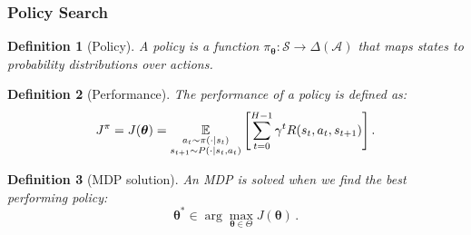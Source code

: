 \documentclass[english,aspectratio=1610]{beamer}
\theoremstyle{mystyle}
\newtheorem{defi}{Definition}
\theoremstyle{mystyle}
\theoremstyle{mystyle}
\begin{document}

\begin{frame}
	\frametitle{Policy Search}
	\begin{defi}[Policy]
	A policy is a function $\pi_{\bm{\theta}}: \mathcal{S} \rightarrow \Delta(\mathcal{A})$ that maps states to probability distributions over actions.
	\end{defi}
	\begin{defi}[Performance]
	The performance of a policy is defined as:
\begin{equation}
	J^\pi = J(\bm{\theta}) = \underset{\begin{subarray}{c}
	a_t \sim \pi(\cdot | s_t) \\
	s_{t+1} \sim P(\cdot | s_t, a_t)
\end{subarray}}{\mathbb{E}} \left[\sum_{t=0}^{H-1} \gamma^t R(s_t,a_t,s_{t+1}) \right] .
\end{equation}
\end{defi}
\begin{defi}[MDP solution]
	An MDP is solved when we find the best performing policy:
\begin{equation}
\bm{\theta}^* \in \arg \max_{\bm{\theta} \in \Theta} J(\bm{\theta}) \, .
\end{equation}
\end{defi}
\end{frame}
\end{document}
